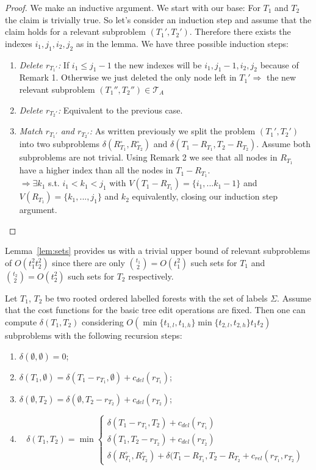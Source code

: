 \begin{proof}
We make an inductive argument. We start with our base: For $T_1$ and $T_2$ the claim is trivially true. So let's consider an induction step and assume that the claim holds for a relevant subproblem $(T_1',T_2')$. Therefore there exists the indexes $i_1,j_1,i_2,j_2$ as in the lemma. We have three possible induction steps:
\begin{enumerate}
\item \textit{Delete $r_{T_1'}$:} If $i_1 \leq j_1-1$ the new indexes will be $i_1,j_1-1,i_2,j_2$ because of Remark 1. Otherwise we just deleted the only node left in $T_1' \Rightarrow $ the new relevant subproblem $(T_1'',T_2'') \in \mathcal{T}_A$
\item \textit{Delete $r_{T_2'}$:} Equivalent to the previous case.
\item \textit{Match $r_{T_1'}$ and $r_{T_2'}$:} As written previously we split the problem $(T_1',T_2')$ into two subproblems $\delta(R_{T_1}^{\circ},R_{T_2}^{\circ})$ and $\delta(T_1-R_{T_1},T_2-R_{T_2})$. Assume both subproblems are not trivial. Using Remark 2 we see that all nodes in $R_{T_1}$ have a higher index than all the nodes in $T_1-R_{T_1}$.\\
$ \Rightarrow \exists k_1$ s.t. $i_1 < k_1 < j_1$ with $V(T_1-R_{T_1})=\{i_1,...k_1-1\}$ and $V(R_{T_1}) = \{k_1,...,j_1\}$ and $k_2$ equivalently,  closing our induction step argument.
\end{enumerate}
\end{proof}
Lemma~\ref{lem:sets} provides us with a trivial upper bound of relevant subproblems of $O(t_1^2t_2^2)$ since there are only $\binom{t_1}{2} = O(t_1^2)$ such sets for $T_1$ and $\binom{t_2}{2} = O(t_2^2)$ such sets for $T_2$ respectively.
\begin{lem}\label{lem:saz}
Let $T_1$, $T_2$ be two rooted ordered labelled forests with the set of labels $\Sigma$. Assume that the cost functions for the basic tree edit operations are fixed. Then one can compute $\delta(T_1,T_2)$ considering $O(\min \{t_{1,l},t_{1,h}\} \min \{t_{2,l}, t_{2,h}\}t_1t_2)$ subproblems with the following recursion steps:
\begin{enumerate}
\item $\delta(\emptyset,\emptyset) = 0$;
\item $\delta(T_1,\emptyset) = \delta(T_1 - r_{T_1},\emptyset)+c_{del}(r_{T_1})$;
\item $\delta(\emptyset,T_2) = \delta(\emptyset, T_2 - r_{T_2})+c_{del}(r_{T_2})$;
\item \[ \delta(T_1,T_2) = \min
	\begin{cases}
	\delta(T_1 - r_{T_1},T_2)+c_{del}(r_{T_1})\\
	\delta(T_1,T_2 - r_{T_2})+c_{del}(r_{T_2})\\
	\delta(R_{T_1}^{\circ},R_{T_2}^{\circ}) + \delta(T_1 - R_{T_1},T_2 - R_{T_2} + c_{rel}(r_{T_1},r_{T_2})
	\end{cases} \]
\end{enumerate}
\end{lem}
